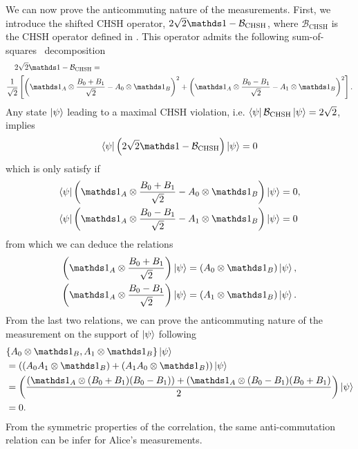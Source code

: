 We can now prove the anticommuting nature of the measurements.
First, we introduce the shifted CHSH operator, $2\sqrt{2}\id-\mathcal{B}_\text{CHSH}$, where $\mathcal{B}_\text{CHSH}$ is the CHSH operator defined in . 
This operator admits the following sum-of-squares~\cite{Pironio2010} decomposition 
\begin{equation}
	\begin{split}
		2&\sqrt{2}\id-\mathcal{B}_\text{CHSH} = \\
		\frac{1}{\sqrt{2}}&\left[ \left(\id_A \otimes \frac{B_0+B_1}{\sqrt{2}} - A_0 \otimes \id_B \right)^2 
		+ \left( \id_A \otimes \frac{ B_0-B_1}{\sqrt{2}} - A_1\otimes \id_B \right)^2 \right].
	\end{split}
\end{equation}
Any state $\ket{\psi}$ leading to a maximal CHSH violation, i.e. $\bra{\psi}\mathcal{B}_\text{CHSH}\ket{\psi}=2\sqrt{2}$, implies
\begin{equation}
	\bra{\psi}\left(2\sqrt{2}\id-\mathcal{B}_\text{CHSH}\right)\ket{\psi} = 0
\end{equation}
which is only satisfy if
\begin{equation}
	\begin{split}
		\bra{\psi} \left(\id_A \otimes \frac{B_0+B_1}{\sqrt{2}} - A_0\otimes \id_B \right)\ket{\psi} &= 0,  \\
		\bra{\psi} \left(\id_A \otimes \frac{B_0-B_1}{\sqrt{2}} - A_1\otimes \id_B \right)\ket{\psi} &= 0 
	\end{split}
\end{equation}
from which we can deduce the relations
\begin{equation}
	\begin{split}
		\left(\id_A \otimes \frac{B_0+B_1}{\sqrt{2}}\right)\ket{\psi} &=  (A_0\otimes \id_B)\ket{\psi}, \\
		\left(\id_A \otimes \frac{B_0-B_1}{\sqrt{2}}\right)\ket{\psi} &=  (A_1\otimes \id_B)\ket{\psi}.
	\end{split}	
	\label{eq:aliceBobMeasEquivalence}
\end{equation}
From the last two relations, we can prove the anticommuting nature of the measurement on the support of $\ket{\psi}$ following
\begin{equation}
	\begin{split}
		&\{A_0 \otimes \id_B,A_1 \otimes \id_B\} \ket{\psi} \\
		& = \left((A_0 A_1 \otimes \id_B)+(A_1 A_0 \otimes \id_B)\right)\ket{\psi}  \\
		& = \left(\frac{(\id_A \otimes (B_0+B_1)(B_0-B_1)) + (\id_A \otimes (B_0-B_1)(B_0+B_1)}{2}\right)\ket{\psi} \\
		& = 0.
	\end{split}
	\label{eq:anticommuting}
\end{equation}
From the symmetric properties of the correlation, the same anti-commutation relation can be infer for Alice's measurements.

